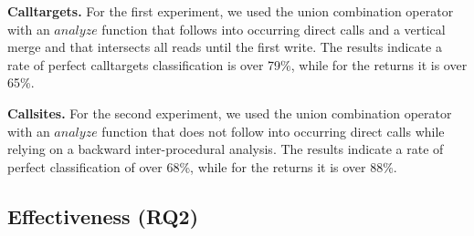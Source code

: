 \textbf{Calltargets.} 
For the first experiment, we used the union combination operator with an $analyze$ function that follows into occurring direct calls 
and a vertical merge and that intersects all reads until the first write.
The results indicate a rate of perfect calltargets classification is over 79\%, while for the returns it is over 65\%.

\textbf{Callsites.} 
For the second experiment, we used the union combination operator with an $analyze$ function that does not follow into occurring direct calls while relying on a backward inter-procedural analysis.
The results indicate a rate of perfect classification of over 68\%, while for the returns it is over 88\%.

\subsection{Effectiveness (RQ2)}
\label{section:typeshieldeffectiveness}

